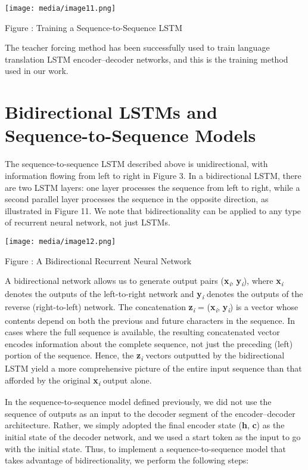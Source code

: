 \documentclass[
]{article}
\begin{document}
\texttt{[image: media/image11.png]}

Figure : Training a Sequence-to-Sequence LSTM

The teacher forcing method has been successfully used to train language
translation LSTM encoder--decoder networks, and this is the training
method used in our work.

\hypertarget{bidirectional-lstms-and-sequence-to-sequence-models}{%
\section{Bidirectional LSTMs and Sequence-to-Sequence
Models}\label{bidirectional-lstms-and-sequence-to-sequence-models}}

The sequence-to-sequence LSTM described above is unidirectional, with
information flowing from left to right in Figure 3. In a bidirectional
LSTM, there are two LSTM layers: one layer processes the sequence from
left to right, while a second parallel layer processes the sequence in
the opposite direction, as illustrated in Figure 11. We note that
bidirectionality can be applied to any type of recurrent neural network,
not just LSTMs.

\texttt{[image: media/image12.png]}

Figure : A Bidirectional Recurrent Neural Network

A bidirectional network allows us to generate output pairs
(\textbf{x}\emph{\textsubscript{i}},
\textbf{y}\emph{\textsubscript{i}}), where
\textbf{x}\emph{\textsubscript{i}} denotes the outputs of the
left-to-right network and \textbf{y}\emph{\textsubscript{i}} denotes the
outputs of the reverse (right-to-left) network. The concatenation
\textbf{z}\emph{\textsubscript{i}} =
(\textbf{x}\emph{\textsubscript{i}}, \textbf{y}\emph{\textsubscript{i}})
is a vector whose contents depend on both the previous and future
characters in the sequence. In cases where the full sequence is
available, the resulting concatenated vector encodes information about
the complete sequence, not just the preceding (left) portion of the
sequence. Hence, the \textbf{z}\emph{\textsubscript{i}} vectors
outputted by the bidirectional LSTM yield a more comprehensive picture
of the entire input sequence than that afforded by the original
\textbf{x}\emph{\textsubscript{i}} output alone.

In the sequence-to-sequence model defined previously, we did not use the
sequence of outputs as an input to the decoder segment of the
encoder--decoder architecture. Rather, we simply adopted the final
encoder state (\textbf{h}, \textbf{c}) as the initial state of the
decoder network, and we used a start token as the input to go with the
initial state. Thus, to implement a sequence-to-sequence model that
takes advantage of bidirectionality, we perform the following steps:
\end{document}
